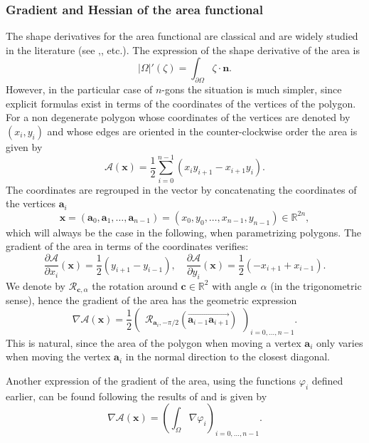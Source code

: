 \documentclass[JEP,XML,SOM,Unicode,ThmDefs,NoFloatCountersInSection,published]{cedram}
\theoremstyle{plain}
\theoremstyle{definition}
\newcommand{\bo}[1]{{\boldsymbol#1}}
\let\Bbb\mathbb
\begin{document}
\subsubsection*{Gradient and Hessian of the area functional} The shape derivatives for the area functional are classical and are widely studied in the literature (see \cite{henrot-pierre-english},\cite{laurain2ndDeriv}, etc.). The expression of the shape derivative of the area is
\begin{equation}
|\Omega|'(\zeta) = \int_{\partial\Omega} \zeta \cdot \bo n.
\label{eq:sh-deriv-area}
\end{equation} However, in the particular case of $n$-gons the situation is much simpler, since explicit formulas exist in terms of the coordinates of the vertices of the polygon. For a non degenerate polygon whose coordinates of the vertices are denoted by $(x_i,y_i)$ and whose edges are oriented in the counter-clockwise order the area is given by
\[
\mathcal A(\bo x) = \frac{1}{2} \sum_{i=0}^{n-1} (x_iy_{i+1}-x_{i+1}y_i).
\]
The coordinates are regrouped in the vector by concatenating the coordinates of the vertices $\bo a_i$
\begin{equation}
\bo x = (\bo a_0,\bo a_1,\dots,\bo a_{n-1}) = (x_0,y_0,\dots,x_{n-1},y_{n-1})\in \Bbb{R}^{2n},
\label{eq:coordinates}
\end{equation}
which will always be the case in the following, when parametrizing polygons.
The gradient of the area in terms of the coordinates verifies:
\[
\frac{\partial \mathcal A}{\partial x_i}(\bo x) = \frac{1}{2}(y_{i+1}-y_{i-1}), \quad
\frac{\partial \mathcal A}{\partial y_i}(\bo x) = \frac{1}{2}(-x_{i+1}+x_{i-1}).
\]
We denote by $\mathcal R_{\bo c,\alpha}$ the rotation around $\bo c \in \Bbb{R}^2$ with angle $\alpha$ (in the trigonometric sense), hence the gradient of the area has the geometric expression
\begin{equation}
\nabla \mathcal A(\bo x) = \frac{1}{2}\begin{pmatrix}
\mathcal R_{\bo a_i,-\pi/2}(\overrightarrow{\bo a_{i-1}\bo a_{i+1}})
\end{pmatrix}_{i=0,\dots,n-1}.
\label{eq:grad-area}
\end{equation}
This is natural, since the area of the polygon when moving a vertex $\bo a_i$ only varies when moving the vertex $\bo a_i$ in the normal direction to the closest diagonal.

Another expression of the gradient of the area, using the functions $\varphi_i$ defined earlier, can be found following the results of \cite{laurain2ndDeriv} and is given by
\begin{equation}
\nabla \mathcal A(\bo x) = \left(\int_\Omega \nabla \varphi_i\right)_{i=0,\dots,n-1}.
\label{eq:grad-area-phi}
\end{equation}
\end{document}
